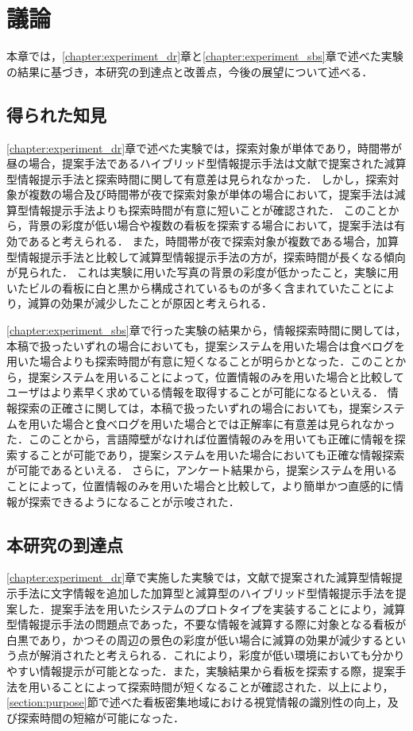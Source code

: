 \chapter{議論}
\label{chapter:discussion}
本章では，\ref{chapter:experiment_dr}章と\ref{chapter:experiment_sbs}章で述べた実験の結果に基づき，本研究の到達点と改善点，今後の展望について述べる．

\section{得られた知見}
\label{section:obtained_knowledge}
  \ref{chapter:experiment_dr}章で述べた実験では，探索対象が単体であり，時間帯が昼の場合，提案手法であるハイブリッド型情報提示手法は文献\cite{Fujita:2013}で提案された減算型情報提示手法と探索時間に関して有意差は見られなかった．
  しかし，探索対象が複数の場合及び時間帯が夜で探索対象が単体の場合において，提案手法は減算型情報提示手法よりも探索時間が有意に短いことが確認された．
  このことから，背景の彩度が低い場合や複数の看板を探索する場合において，提案手法は有効であると考えられる．
  また，時間帯が夜で探索対象が複数である場合，加算型情報提示手法と比較して減算型情報提示手法の方が，探索時間が長くなる傾向が見られた．
  これは実験に用いた写真の背景の彩度が低かったこと，実験に用いたビルの看板に白と黒から構成されているものが多く含まれていたことにより，減算の効果が減少したことが原因と考えられる．

  \ref{chapter:experiment_sbs}章で行った実験の結果から，情報探索時間に関しては，本稿で扱ったいずれの場合においても，提案システムを用いた場合は食べログを用いた場合よりも探索時間が有意に短くなることが明らかとなった．このことから，提案システムを用いることによって，位置情報のみを用いた場合と比較してユーザはより素早く求めている情報を取得することが可能になるといえる．
  情報探索の正確さに関しては，本稿で扱ったいずれの場合においても，提案システムを用いた場合と食べログを用いた場合とでは正解率に有意差は見られなかった．このことから，言語障壁がなければ位置情報のみを用いても正確に情報を探索することが可能であり，提案システムを用いた場合においても正確な情報探索が可能であるといえる．
  さらに，アンケート結果から，提案システムを用いることによって，位置情報のみを用いた場合と比較して，より簡単かつ直感的に情報が探索できるようになることが示唆された．

\section{本研究の到達点}
  \ref{chapter:experiment_dr}章で実施した実験では，文献\cite{Fujita:2013}で提案された減算型情報提示手法に文字情報を追加した加算型と減算型のハイブリッド型情報提示手法を提案した．提案手法を用いたシステムのプロトタイプを実装することにより，減算型情報提示手法の問題点であった，不要な情報を減算する際に対象となる看板が白黒であり，かつその周辺の景色の彩度が低い場合に減算の効果が減少するという点が解消されたと考えられる．これにより，彩度が低い環境においても分かりやすい情報提示が可能となった．また，実験結果から看板を探索する際，提案手法を用いることによって探索時間が短くなることが確認された．以上により，\ref{section:purpose}節で述べた看板密集地域における視覚情報の識別性の向上，及び探索時間の短縮が可能になった．

